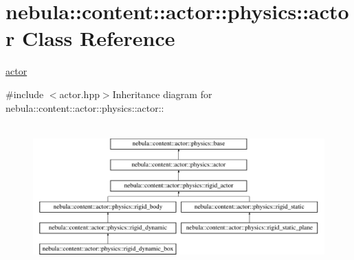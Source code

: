 \hypertarget{classnebula_1_1content_1_1actor_1_1physics_1_1actor}{
\section{nebula::content::actor::physics::actor Class Reference}
\label{classnebula_1_1content_1_1actor_1_1physics_1_1actor}
}


\hyperlink{classnebula_1_1content_1_1actor_1_1physics_1_1actor}{actor}  


{\ttfamily \#include $<$actor.hpp$>$}Inheritance diagram for nebula::content::actor::physics::actor::\begin{figure}[H]
\begin{center}
\leavevmode
\includegraphics[height=5.5814cm]{classnebula_1_1content_1_1actor_1_1physics_1_1actor}
\end{center}
\end{figure}
